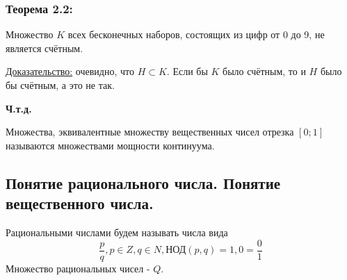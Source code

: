 \documentclass[12pt]{article}
\begin{document}
    \subsubsection*{Теорема 2.2:}
    Множество $K$ всех бесконечных наборов, состоящих из цифр от 0 до 9, не является счётным.\par\noindent
    \underline{Доказательство:} очевидно, что $H \subset K$. Если бы $K$ было счётным, то и $H$ было бы счётным, а это не так.
    \begin{center}
        \textbf{Ч.т.д.}
    \end{center}
    Множества, эквивалентные множеству вещественных чисел отрезка $[0;1]$ называются множествами мощности континуума.

    \subsection{Понятие рационального числа. Понятие вещественного числа.}
    \noindent Рациональными числами будем называть числа вида \[\frac{p}{q}, p \in Z, q \in N, \text{НОД}(p,q) = 1, 0 = \frac{0}{1}\]
    Множество рациональных чисел - $Q$.
\end{document}
